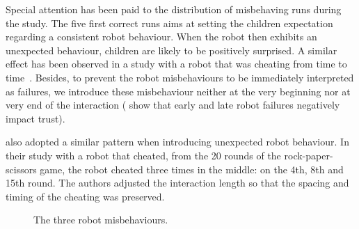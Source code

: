 \documentclass{sig-alternate}
\begin{document}
Special attention has been paid to the distribution of misbehaving runs during
the study. The five first correct runs aims at setting the children expectation
regarding a consistent robot behaviour. When the robot then exhibits an
unexpected behaviour, children are likely to be positively surprised. A similar
effect has been observed in a study with a robot that was cheating from time to
time~\cite{short_no_2010}.  Besides, to prevent the robot misbehaviours to be
immediately interpreted as failures, we introduce these misbehaviour neither at
the very beginning nor at very end of the interaction
(\cite{desai_effects_2012,desai_impact_2013} show that early and late robot
failures negatively impact trust).

\cite{short_no_2010} also adopted a similar pattern when introducing unexpected
robot behaviour. In their study with a robot that cheated, from the 20 rounds of
the rock-paper-scissors game, the robot cheated three times in the middle: on
the 4th, 8th and 15th round. The authors adjusted the interaction length so that
the spacing and timing of the cheating was preserved.

\begin{figure}[!t]
    \centering
    \caption{\small The three robot misbehaviours.}
    \label{fig:domino-misbehaviour}
\end{figure}
\end{document}
